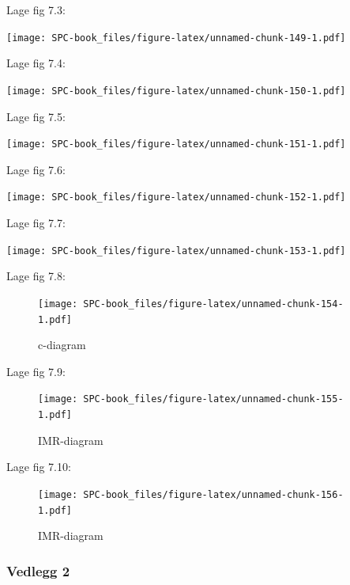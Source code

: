 \documentclass[
]{book}
\begin{document}
Lage fig 7.3:

\texttt{[image: SPC-book\_files/figure-latex/unnamed-chunk-149-1.pdf]}

Lage fig 7.4:

\texttt{[image: SPC-book\_files/figure-latex/unnamed-chunk-150-1.pdf]}

Lage fig 7.5:

\texttt{[image: SPC-book\_files/figure-latex/unnamed-chunk-151-1.pdf]}

Lage fig 7.6:

\texttt{[image: SPC-book\_files/figure-latex/unnamed-chunk-152-1.pdf]}

Lage fig 7.7:

\texttt{[image: SPC-book\_files/figure-latex/unnamed-chunk-153-1.pdf]}

Lage fig 7.8:

\begin{figure}
\centering
\texttt{[image: SPC-book\_files/figure-latex/unnamed-chunk-154-1.pdf]}
\caption{\label{fig:unnamed-chunk-154}c-diagram}
\end{figure}

Lage fig 7.9:

\begin{figure}
\centering
\texttt{[image: SPC-book\_files/figure-latex/unnamed-chunk-155-1.pdf]}
\caption{\label{fig:unnamed-chunk-155}IMR-diagram}
\end{figure}

Lage fig 7.10:

\begin{figure}
\centering
\texttt{[image: SPC-book\_files/figure-latex/unnamed-chunk-156-1.pdf]}
\caption{\label{fig:unnamed-chunk-156}IMR-diagram}
\end{figure}

\hypertarget{vedlegg-2}{%
\subsubsection*{Vedlegg 2}\label{vedlegg-2}}
\end{document}
